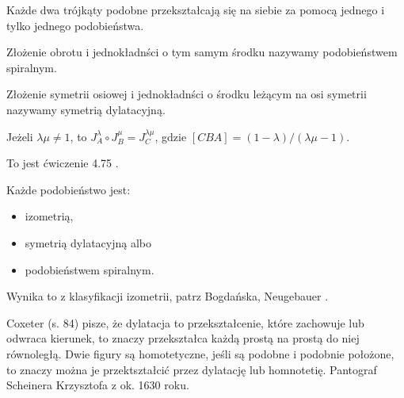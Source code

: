 \begin{proposition}
    Każde dwa trójkąty podobne przekształcają się na siebie za pomocą jednego i tylko jednego podobieństwa.
\end{proposition}


\begin{definition}
    Złożenie obrotu i jednokładnści o tym samym środku nazywamy podobieństwem spiralnym.
\end{definition}

\begin{definition}
    Złożenie symetrii osiowej i jednokładnści o środku leżącym na osi symetrii nazywamy symetrią dylatacyjną.
\end{definition}

\begin{proposition}
    Jeżeli $\lambda \mu \neq 1$, to $J_A^\lambda \circ J_B^\mu = J_C^{\lambda \mu}$, gdzie $[CBA] = (1-\lambda) / (\lambda \mu - 1)$.
\end{proposition}

To jest ćwiczenie 4.75 \cite[s. 217]{neugebauer_2018}.

\begin{proposition}
\label{podobienstwa_klasyfikacja}%
    Każde podobieństwo jest:
    \begin{itemize}
        \item izometrią,
        \item symetrią dylatacyjną albo
        \item podobieństwem spiralnym.
    \end{itemize}
\end{proposition}

Wynika to z klasyfikacji izometrii, patrz Bogdańska, Neugebauer \cite[s. 220]{neugebauer_2018}.

Coxeter (s. 84) pisze, że dylatacja to przekształcenie, które zachowuje lub odwraca kierunek, to znaczy przekształca każdą prostą na prostą do niej równoległą.
Dwie figury są homotetyczne, jeśli są podobne i podobnie położone, to znaczy można je przektształcić przez dylatację lub homnotetię.
Pantograf Scheinera Krzysztofa z ok. 1630 roku.
